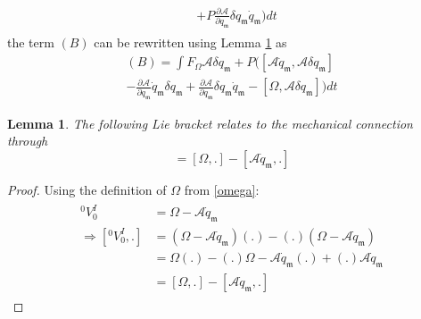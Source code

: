 \documentclass[lettersize,journal]{IEEEtran}
\def \A {\mathcal{A}}
\newtheorem{lemma}{Lemma}
\theoremstyle{remark}
\begin{document}
\begin{itemize}
\begin{align}
\begin{split}
    &+P\frac{\partial \A}{\partial q_\mathfrak{m}}\delta q_\mathfrak{m} \dot{q}_\mathfrak{m})dt
\end{split}
\end{align}
the term $(B)$ can be rewritten using Lemma \ref{lemmabracket} as
\begin{multline}
    (B)= \int F_{\Omega}\A\delta q_\mathfrak{m} + P([\A\dot{q}_\mathfrak{m},\A\delta q_\mathfrak{m}]\\
    -\frac{\partial \A}{\partial q_\mathfrak{m}}\dot{q}_\mathfrak{m}\delta q_\mathfrak{m}
    +\frac{\partial \A}{\partial q_\mathfrak{m}}\delta q_\mathfrak{m} \dot{q}_\mathfrak{m}-[\Omega,\A\delta q_\mathfrak{m}])dt
    \label{finalB}
\end{multline}
\begin{lemma}\label{lemmabracket}
The following Lie bracket relates to the mechanical connection through
\begin{equation}
    [{}^0V^I_0,.]=[\Omega,.]-[\A\dot{q}_\mathfrak{m},.]
\end{equation}
\end{lemma}
\begin{proof}[Proof]
Using the definition of $\Omega$ from \eqref{omega}:
\begin{align}
    \begin{split}
    {}^0V^I_0 &=\Omega-\A\dot{q}_\mathfrak{m}\\
        \Rightarrow [{}^0V^I_0,.] &=(\Omega-\A\dot{q}_\mathfrak{m})(.)-(.)(\Omega-\A\dot{q}_\mathfrak{m})\\
        &=\Omega(.)-(.)\Omega-\A\dot{q}_\mathfrak{m}(.)+(.)\A\dot{q}_\mathfrak{m}\\
        &=[\Omega,.]-[\A\dot{q}_\mathfrak{m},.]
    \end{split}
\end{align}
\end{proof}
\end{itemize}

\end{document}
